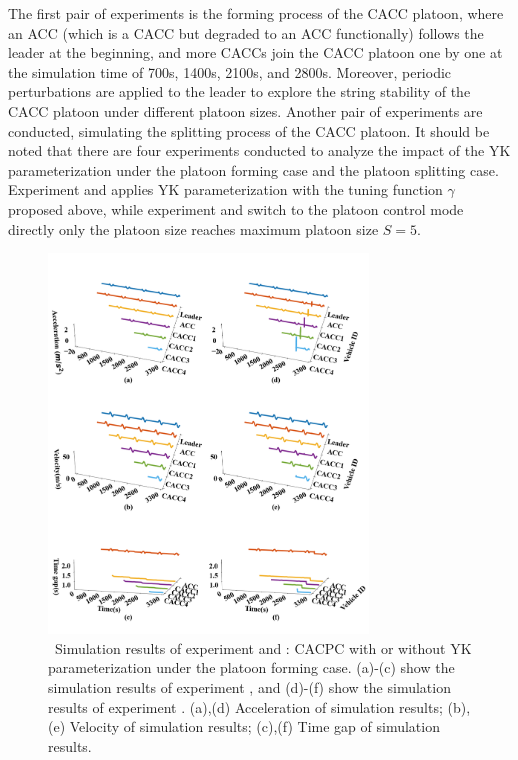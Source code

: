 \documentclass[journal]{IEEEtran}
\begin{document}
The first pair of experiments is the forming process of the CACC platoon, where an ACC (which is a CACC but degraded to an ACC functionally) follows the leader at the beginning, and more CACCs join the CACC platoon one by one at the simulation time of 700s, 1400s, 2100s, and 2800s. Moreover, periodic perturbations are applied to the leader to explore the string stability of the CACC platoon under different platoon sizes. Another pair of experiments are conducted, simulating the splitting process of the CACC platoon. It should be noted that there are four experiments conducted to analyze the impact of the YK parameterization under the platoon forming case and the platoon splitting case. Experiment \uppercase\expandafter{} and \uppercase\expandafter{} applies YK parameterization with the tuning function $\gamma$ proposed above, while experiment \uppercase\expandafter{} and \uppercase\expandafter{} switch to the platoon control mode directly only the platoon size reaches maximum platoon size $S=5$.

\begin{figure}
  \centering
  \includegraphics[width=8.5cm]{figs/c_form.png}
  \caption{~Simulation results of experiment \uppercase\expandafter{} and \uppercase\expandafter{}: CACPC with or without YK parameterization under the platoon forming case. (a)-(c) show the simulation results of experiment \uppercase\expandafter{}, and (d)-(f) show the simulation results of experiment \uppercase\expandafter{}. (a),(d) Acceleration of simulation results; (b),(e) Velocity of simulation results; (c),(f) Time gap of simulation results.}
  \label{new1}
\end{figure}
\end{document}
